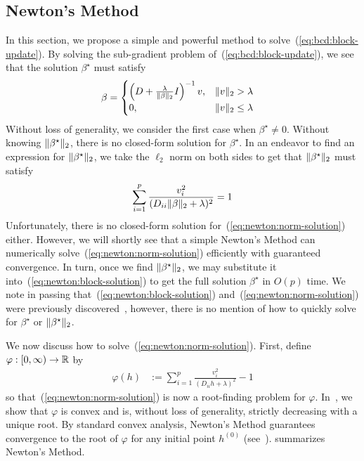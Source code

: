 \subsection{Newton's Method}\label{ssec:newton}

In this section, we propose 
a simple and powerful method to solve~(\ref{eq:bcd:block-update}).
By solving the sub-gradient problem of~(\ref{eq:bcd:block-update}),
we see that the solution $\beta^\star$ must satisfy
\begin{align}
    \beta
    &=
    \begin{cases}
    \left(D + \frac{\lambda}{\|\beta\|_2} I\right)^{-1} v ,& \|v\|_2 > \lambda \\
    0 ,& \|v\|_2 \leq \lambda
    \end{cases}
    \label{eq:newton:block-solution}
\end{align}
Without loss of generality, we consider the first case when $\beta^\star \neq 0$.
Without knowing $\|\beta^\star\|_2$, there is no closed-form solution for $\beta^\star$.
In an endeavor to find an expression for $\|\beta^\star\|_2$,
we take the $\ell_2$ norm on both sides to get that $\|\beta^\star\|_2$ must satisfy
\begin{align}
    \sum\limits_{i=1}^p
    \frac{v_i^2}{(D_{ii} \|\beta\|_2 + \lambda)^2}
    =
    1
    \label{eq:newton:norm-solution}
\end{align}
Unfortunately, there is no closed-form solution for~(\ref{eq:newton:norm-solution}) either.
However, we will shortly see that a simple Newton's Method 
can numerically solve~(\ref{eq:newton:norm-solution}) efficiently with guaranteed convergence.
In turn, once we find $\|\beta^\star\|_2$, we may substitute it
into~(\ref{eq:newton:block-solution}) to get the full solution $\beta^\star$ in $O(p)$ time.
We note in passing that~(\ref{eq:newton:block-solution}) and~(\ref{eq:newton:norm-solution})
were previously discovered~\citep{sls:2016},
however, there is no mention of how to quickly solve for $\beta^\star$ or $\|\beta^\star\|_2$.

We now discuss how to solve~(\ref{eq:newton:norm-solution}).
First, define $\varphi : [0, \infty) \to \mathbb{R}$ by
\begin{align}
    \varphi(h)
    &:=
    \sum\limits_{i=1}^p
    \frac{v_i^2}{(D_{ii} h + \lambda)^2}
    - 1
    \label{eq:varphi-def}
\end{align}
so that~(\ref{eq:newton:norm-solution}) is now a root-finding problem for $\varphi$.
In~, we show that $\varphi$ is 
convex and is, without loss of generality, 
strictly decreasing with a unique root.
By standard convex analysis, Newton's Method guarantees convergence to the root of $\varphi$
for any initial point $h^{(0)}$ (see~).
 summarizes Newton's Method.

